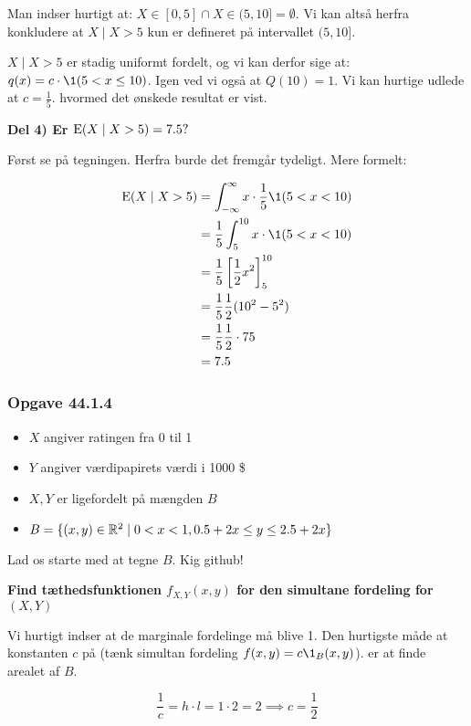 Man indser hurtigt at: $X \in [0, 5] \cap X \in (5,10] = \emptyset$. Vi kan altså herfra konkludere at $X \mid X>5$ kun er defineret på intervallet $(5, 10]$. 

$X \mid X>5$ er stadig uniformt fordelt, og vi kan derfor sige at: $q(x) = c \cdot \1(5 < x \leq 10)$. Igen ved vi også at $Q(10) = 1$. Vi kan hurtige udlede at $c=\frac{1}{5}$. hvormed det ønskede resultat er vist.

\textbf{Del 4) Er $\text{E}(X \mid X>5) = 7.5?$}

Først se på tegningen. Herfra burde det fremgår tydeligt. Mere formelt:

\begin{align}
    \E(X \mid X>5) &= \int_{-\infty}^{\infty}x \cdot \frac{1}{5}\1(5 < x <10) \\
    &= \frac{1}{5}\int_{5}^{10} x \cdot \1(5 < x <10) \\
    &= \frac{1}{5}\lsp \frac{1}{2}x^2 \rsp_{5}^{10} \\
    &= \frac{1}{5}\frac{1}{2}(10^2 - 5^2) \\
    &= \frac{1}{5}\frac{1}{2} \cdot 75 \\
    &= 7.5
\end{align}


\subsubsection{Opgave 44.1.4}

\begin{itemize}
    \item $X$ angiver ratingen fra 0 til 1
    \item $Y$ angiver værdipapirets værdi i 1000 \$
    \item $X, Y$ er ligefordelt på mængden $B$
    \item $B = \{(x,y) \in \mathbb{R}^2 \mid 0 < x < 1, 0.5 + 2x \leq y \leq 2.5 + 2x \}$
\end{itemize}

Lad os starte med at tegne $B$. Kig github!


\textbf{Find tæthedsfunktionen $f_{X, Y}(x,y)$ for den simultane fordeling for $(X,Y)$}

Vi hurtigt indser at de marginale fordelinge må blive 1. Den hurtigste måde at konstanten $c$ på (tænk simultan fordeling $f(x,y) = c \1_{B} (x, y)$). er at finde arealet af $B$.

\begin{equation}
    \frac{1}{c}= h \cdot l = 1 \cdot 2 = 2 \implies c = \frac{1}{2}
\end{equation}

